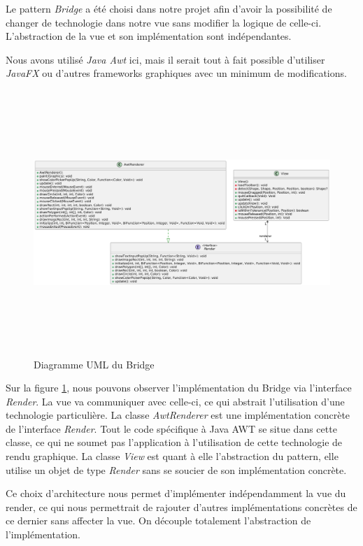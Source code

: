 \documentclass{article}
\begin{document}
Le pattern \textit{Bridge} a été choisi dans notre projet afin d'avoir la possibilité de changer de technologie dans notre vue
 sans modifier la logique de celle-ci. L'abstraction de la vue et son implémentation sont indépendantes.

Nous avons utilisé \textit{Java Awt} ici, mais il serait tout à fait possible d'utiliser \textit{JavaFX} ou d'autres frameworks graphiques
avec un minimum de modifications.

\begin{figure}[h]
    \centering
    \includegraphics[width=\textwidth,height=10.0cm,keepaspectratio]{bridge.png}
    \caption{Diagramme UML du Bridge}
    \label{Bridge}
\end{figure}
\FloatBarrier

Sur la figure \ref{Bridge}, nous pouvons observer l'implémentation du Bridge via l'interface \textit{Render}.
La vue va communiquer avec celle-ci, ce qui abstrait l'utilisation d'une technologie particulière.
La classe \textit{AwtRenderer} est une implémentation concrète de l'interface \textit{Render}. 
Tout le code spécifique à Java AWT se situe dans cette classe, ce qui ne soumet pas l'application à
l'utilisation de cette technologie de rendu graphique.
La classe \textit{View} est quant à elle l'abstraction du pattern, elle utilise un objet de type \textit{Render} sans se soucier de son implémentation concrète.

Ce choix d'architecture nous permet d'implémenter indépendamment la vue du render, ce qui nous permettrait de rajouter d'autres
implémentations concrètes de ce dernier sans affecter la vue.
On découple totalement l'abstraction de l'implémentation.
\FloatBarrier
\end{document}
